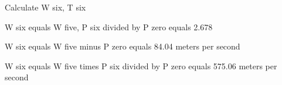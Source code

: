 Calculate W six, T six

W six equals W five, P six divided by P zero equals 2.678

W six equals W five minus P zero equals 84.04 meters per second

W six equals W five times P six divided by P zero equals 575.06 meters per second